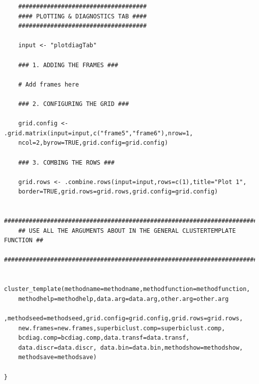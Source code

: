 \documentclass[a4paper]{article}\usepackage[]{graphicx}\usepackage[]{color}
\begin{document}
\begin{verbatim}
	####################################
	#### PLOTTING & DIAGNOSTICS TAB ####
	####################################
	
	input <- "plotdiagTab"
		
	### 1. ADDING THE FRAMES ###
	
	# Add frames here
	
	### 2. CONFIGURING THE GRID ###
	
	grid.config <- .grid.matrix(input=input,c("frame5","frame6"),nrow=1,
    ncol=2,byrow=TRUE,grid.config=grid.config)
		
	### 3. COMBING THE ROWS ###
	
	grid.rows <- .combine.rows(input=input,rows=c(1),title="Plot 1",
    border=TRUE,grid.rows=grid.rows,grid.config=grid.config)
		
	#########################################################################
	## USE ALL THE ARGUMENTS ABOUT IN THE GENERAL CLUSTERTEMPLATE FUNCTION ##
	#########################################################################
	
	cluster_template(methodname=methodname,methodfunction=methodfunction,
    methodhelp=methodhelp,data.arg=data.arg,other.arg=other.arg
    ,methodseed=methodseed,grid.config=grid.config,grid.rows=grid.rows,
    new.frames=new.frames,superbiclust.comp=superbiclust.comp,
    bcdiag.comp=bcdiag.comp,data.transf=data.transf,
    data.discr=data.discr, data.bin=data.bin,methodshow=methodshow,
    methodsave=methodsave)
	
}
\end{verbatim}
\end{document}
